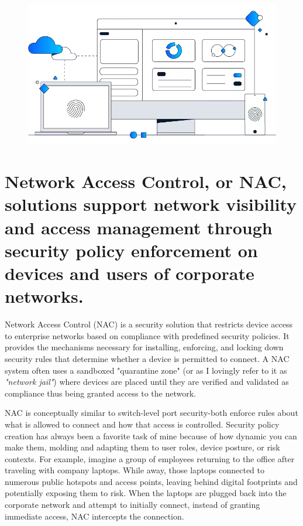 \begin{figure}
    \centering
    \includegraphics[width=1\linewidth]{NAC.png}

\end{figure}
\chapter{Network Access Control, or NAC, solutions support network visibility and access management through security policy enforcement on devices and users of corporate networks.}
Network Access Control (NAC) is a security solution that restricts device access to enterprise networks based on compliance with predefined security policies. It provides the mechanisms necessary for installing, enforcing, and locking down security rules that determine whether a device is permitted to connect. A NAC system often uses a sandboxed "quarantine zone" (or as I lovingly refer to it as \textit{"network jail"}) where devices are placed until they are verified and validated as compliance thus being granted access to the network.

NAC is conceptually similar to switch-level port security-both enforce rules about what is allowed to connect and how that access is controlled. Security policy creation has always been a favorite task of mine because of how dynamic you can make them, molding and adapting them to user roles, device posture, or risk contexts. For example, imagine a group of employees returning to the office after traveling with company laptops. While away, those laptops connected to numerous public hotspots and access points, leaving behind digital footprints and potentially exposing them to risk. When the laptops are plugged back into the corporate network and attempt to initially connect, instead of granting immediate access, NAC intercepts the connection.

